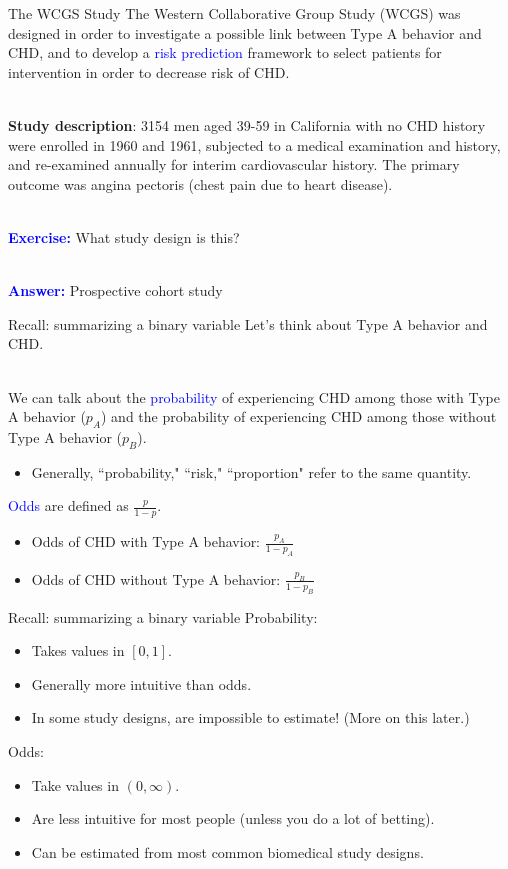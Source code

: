 \documentclass[10pt,t]{beamer}
\begin{document}
\begin{frame}{The WCGS Study}
	The Western Collaborative Group Study (WCGS) was designed in order to investigate a possible link between Type A behavior and CHD, and to develop a \textcolor{blue}{risk prediction} framework to select patients for intervention in order to decrease risk of CHD. 
	\\ ~\ 
	
	\textbf{Study description}: 3154 men aged 39-59 in California with no CHD history were enrolled in 1960 and 1961, subjected to a medical examination and history, and re-examined annually for interim cardiovascular history. The primary outcome was angina pectoris (chest pain due to heart disease). 
	\\ ~\
	
	\textcolor{blue}{\textbf{Exercise:}} What study design is this? \pause
	\\~\
	
	\textcolor{blue}{\textbf{Answer:}} Prospective cohort study
\end{frame}

\begin{frame}{Recall: summarizing a binary variable}
	Let's think about Type A behavior  and CHD. 
	\\ ~\ 
	
	We can talk about the \textcolor{blue}{probability} of experiencing CHD among those with Type A behavior ($p_A$) and the probability of experiencing CHD among those without Type A behavior ($p_B$).
	\begin{itemize}
		\item Generally, ``probability," ``risk," ``proportion" refer to the same quantity.
	\end{itemize}
	\textcolor{blue}{Odds} are defined as $\frac{p}{1-p}$.
	\begin{itemize}
		\item Odds of CHD with Type A behavior: $\frac{p_A}{1-p_A}$
		\item Odds of CHD without Type A behavior: $\frac{p_B}{1-p_B}$
	\end{itemize}
\end{frame}

\begin{frame}{Recall: summarizing a binary variable}
Probability:
\begin{itemize}
	\item Takes values in $[0,1]$.
	\item Generally more intuitive than odds. 
	\item In some study designs, are impossible to estimate! (More on this later.)
\end{itemize}
Odds:
\begin{itemize}
	\item Take values in $(0,\infty)$.
	\item Are less intuitive for most people (unless you do a lot of betting).
	\item Can be estimated from most common biomedical study designs. 
\end{itemize}
\end{frame}
\end{document}
